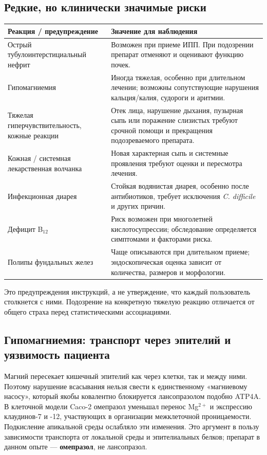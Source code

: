 \documentclass[11pt,a4paper,notitlepage]{report}
\newcommand{\src}[1]{\unskip\space\cite{#1}}
\begin{document}
\subsection{Редкие, но клинически значимые риски}
\begin{longtable}{P{0.30\textwidth}P{0.63\textwidth}}
\toprule
Реакция / предупреждение & Значение для наблюдения \\
\midrule
\endhead
Острый тубулоинтерстициальный нефрит & Возможен при приеме ИПП. При подозрении препарат отменяют и оценивают функцию почек. \\
Гипомагниемия & Иногда тяжелая, особенно при длительном лечении; возможны сопутствующие нарушения кальция/калия, судороги и аритмии. \\
Тяжелая гиперчувствительность, кожные реакции & Отек лица, нарушение дыхания, пузырная сыпь или поражение слизистых требуют срочной помощи и прекращения подозреваемого препарата. \\
Кожная / системная лекарственная волчанка & Новая характерная сыпь и системные проявления требуют оценки и пересмотра лечения. \\
Инфекционная диарея & Стойкая водянистая диарея, особенно после антибиотиков, требует исключения \textit{C. difficile} и других причин. \\
Дефицит B$_{12}$ & Риск возможен при многолетней кислотосупрессии; обследование определяется симптомами и факторами риска. \\
Полипы фундальных желез & Чаще описываются при длительном приеме; эндоскопическая оценка зависит от количества, размеров и морфологии. \\
\bottomrule
\end{longtable}
Это предупреждения инструкций, а не утверждение, что каждый пользователь столкнется с ними. Подозрение на конкретную тяжелую реакцию отличается от общего страха перед статистическими ассоциациями.\src{uslabel,hpra}

\subsection{Гипомагниемия: транспорт через эпителий и уязвимость пациента}
Магний пересекает кишечный эпителий как через клетки, так и между ними. Поэтому нарушение всасывания нельзя свести к единственному «магниевому насосу», который якобы ковалентно блокируется лансопразолом подобно ATP4A. В клеточной модели Caco-2 омепразол уменьшал перенос Mg$^{2+}$ и экспрессию клаудинов-7 и -12, участвующих в организации межклеточной проницаемости. Подкисление апикальной среды ослабляло эти изменения. Это аргумент в пользу зависимости транспорта от локальной среды и эпителиальных белков; препарат в данном опыте --- \textbf{омепразол}, не лансопразол.\src{safemgclaudin}
\end{document}
